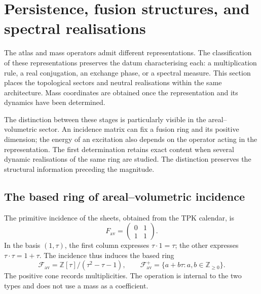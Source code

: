 \section{Persistence, fusion structures, and spectral realisations}
\label{vi:vi:sec:topologia}

The atlas and mass operators admit different representations. The
classification of these representations preserves the datum characterising
each: a multiplication rule, a real conjugation, an exchange phase,
or a spectral measure. This section places the topological
sectors and neutral realisations within the same architecture.
Mass coordinates are obtained once the representation and its
dynamics have been determined.

The distinction between these stages is particularly visible in the
areal--volumetric sector. An incidence matrix can fix a fusion ring
and its positive dimension; the energy of an excitation also depends on the
operator acting in the representation. The first determination retains
exact content when several dynamic realisations of
the same ring are studied. The distinction preserves the structural information
preceding the magnitude.

\subsection{The based ring of areal--volumetric incidence}
\label{vi:vi:subsec:fusion-av}

The primitive incidence of the sheets, obtained from the TPK calendar, is
\[
 F_{\mathrm{av}}=\begin{pmatrix}0&1\\1&1\end{pmatrix}.
\]
In the basis $(1,\tau)$, the first column expresses
$\tau\cdot1=\tau$; the other expresses $\tau\cdot\tau=1+\tau$.
The incidence thus induces the based ring
\[
 \mathcal F_{\mathrm{av}}=\mathbb Z[\tau]/(\tau^2-\tau-1),
 \qquad \mathcal F_{\mathrm{av}}^+
 =\{a+b\tau:a,b\in\mathbb Z_{\geq0}\}.
\]
The positive cone records multiplicities. The operation is internal to the
two types and does not use a mass as a coefficient.


